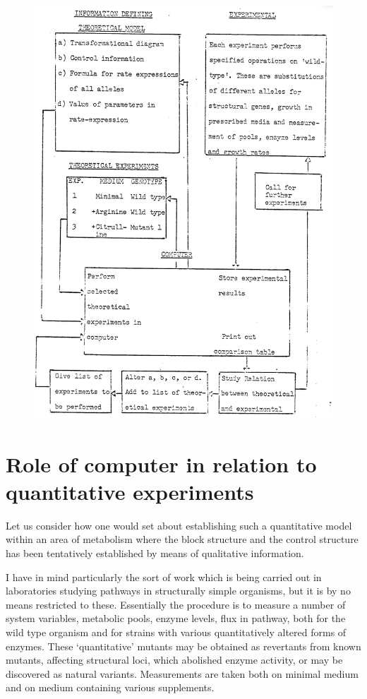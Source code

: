 \begin{figure}
\includegraphics[scale = 1]{figure0_1.png}
\end{figure}

\section{Role of computer in relation to quantitative experiments}

Let us consider how one would set about establishing such a quantitative model within an area of metabolism where the block structure and the control structure has been tentatively established by means of qualitative information.

I have in mind particularly the sort of work which is being carried out in laboratories studying pathways in structurally simple organisms, but it is by no means restricted to these. Essentially the procedure is to measure a number of system variables, metabolic pools, enzyme levels, flux in pathway, both for the wild type organism and for strains with various quantitatively altered forms of enzymes. These `quantitative' mutants may be obtained as revertants from known mutants, affecting structural loci, which abolished enzyme activity, or may be discovered as natural variants. Measurements are taken both on minimal medium and on medium containing various supplements.

